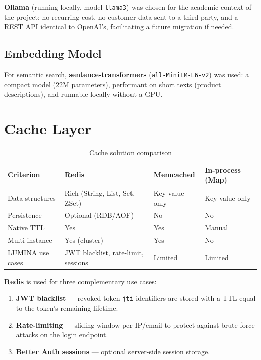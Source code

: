 \textbf{Ollama} (running locally, model \texttt{llama3}) was chosen for the
academic context of the project: no recurring cost, no customer data sent to
a third party, and a REST API identical to OpenAI's, facilitating a future
migration if needed.

\subsection{Embedding Model}

For semantic search, \textbf{sentence-transformers}
(\texttt{all-MiniLM-L6-v2}) was used: a compact model (22M parameters),
performant on short texts (product descriptions), and runnable locally without a GPU.

\section{Cache Layer}

\begin{table}[H]
\centering
\caption{Cache solution comparison}
\begin{tabularx}{\textwidth}{|l|X|X|X|}
\hline
\rowcolor{gray!20}
\textbf{Criterion} & \textbf{Redis} & \textbf{Memcached} & \textbf{In-process (Map)} \\
\hline
Data structures & \cellcolor{green!15}Rich (String, List, Set, ZSet) & Key-value only & Key-value only \\
\hline
Persistence & \cellcolor{green!15}Optional (RDB/AOF) & No & No \\
\hline
Native TTL & \cellcolor{green!15}Yes & Yes & Manual \\
\hline
Multi-instance & \cellcolor{green!15}Yes (cluster) & Yes & No \\
\hline
LUMINA use cases & \cellcolor{green!15}JWT blacklist, rate-limit, sessions & Limited & Limited \\
\hline
\end{tabularx}
\end{table}

\textbf{Redis} is used for three complementary use cases:
\begin{enumerate}
  \item \textbf{JWT blacklist} --- revoked token \texttt{jti} identifiers are stored
        with a TTL equal to the token's remaining lifetime.
  \item \textbf{Rate-limiting} --- sliding window per IP/email to protect against
        brute-force attacks on the login endpoint.
  \item \textbf{Better Auth sessions} --- optional server-side session storage.
\end{enumerate}

